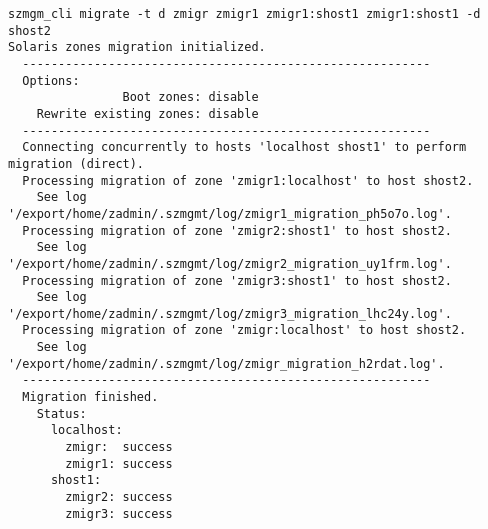 \begin{lstlisting}[basicstyle=\scriptsize\ttfamily, caption={Migrace zón}, float,label={code:test:migration}]  
szmgm_cli migrate -t d zmigr zmigr1 zmigr1:shost1 zmigr1:shost1 -d shost2
Solaris zones migration initialized.
  ---------------------------------------------------------
  Options:
                Boot zones: disable
    Rewrite existing zones: disable
  ---------------------------------------------------------
  Connecting concurrently to hosts 'localhost shost1' to perform migration (direct).
  Processing migration of zone 'zmigr1:localhost' to host shost2. 
    See log '/export/home/zadmin/.szmgmt/log/zmigr1_migration_ph5o7o.log'. 
  Processing migration of zone 'zmigr2:shost1' to host shost2. 
    See log '/export/home/zadmin/.szmgmt/log/zmigr2_migration_uy1frm.log'.
  Processing migration of zone 'zmigr3:shost1' to host shost2. 
    See log '/export/home/zadmin/.szmgmt/log/zmigr3_migration_lhc24y.log'.
  Processing migration of zone 'zmigr:localhost' to host shost2. 
    See log '/export/home/zadmin/.szmgmt/log/zmigr_migration_h2rdat.log'.
  ---------------------------------------------------------
  Migration finished.
    Status:
      localhost:
        zmigr:  success
        zmigr1: success
      shost1:
        zmigr2: success
        zmigr3: success

\end{lstlisting}

